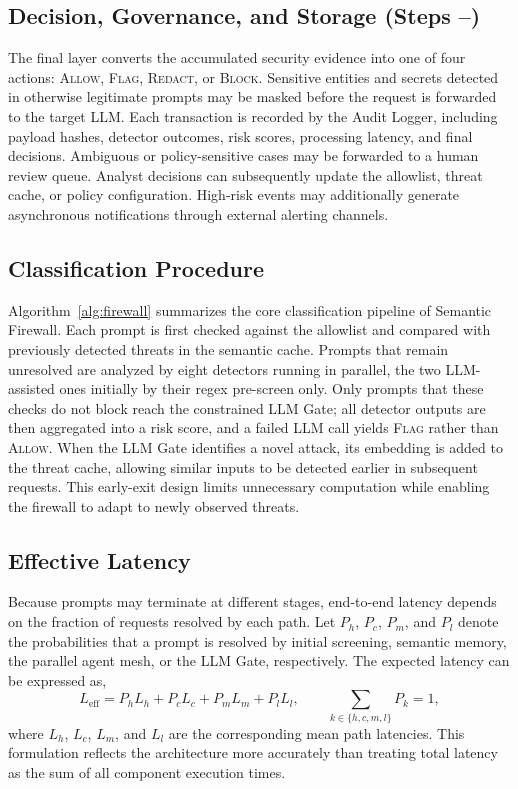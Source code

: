 \documentclass[runningheads]{llncs}
\newif\ifrev
\newcommand{\rev}[1]{\ifrev\hl{#1}\else#1\fi}                  %
\newcommand{\revm}[1]{\ifrev\colorbox{yellow}{$#1$}\else#1\fi} %
\begin{document}
\subsection{Decision, Governance, and Storage (Steps --)}
The final layer converts the accumulated security evidence into one of four actions: \textsc{Allow}, \textsc{Flag}, \textsc{Redact}, or \textsc{Block}. Sensitive entities and secrets detected in otherwise legitimate prompts may be masked before the request is forwarded to the target LLM. Each transaction is recorded by the Audit Logger, including payload hashes, detector outcomes, risk scores, processing latency, and final decisions. Ambiguous or policy-sensitive cases may be forwarded to a human review queue. Analyst decisions can subsequently update the allowlist, threat cache, or policy configuration. High-risk events may additionally generate asynchronous notifications through external alerting channels.
\subsection{Classification Procedure}

Algorithm~\ref{alg:firewall} summarizes the core classification pipeline of Semantic Firewall. Each prompt is first \rev{checked against the allowlist and} compared with previously detected threats in the semantic cache. Prompts that remain unresolved are analyzed by eight detectors running in parallel\rev{, the two LLM-assisted ones initially by their regex pre-screen only}. Only prompts \rev{that these checks do not block} reach the constrained LLM Gate\rev{; all detector outputs are then aggregated into a risk score, and a failed LLM call yields \textsc{Flag} rather than \textsc{Allow}}. When the LLM Gate identifies a novel attack, its embedding is added to the threat cache, allowing similar inputs to be detected earlier in subsequent requests. This early-exit design limits unnecessary computation while enabling the firewall to adapt to newly observed threats.

\subsection{Effective Latency}
Because prompts may terminate at different stages, end-to-end latency depends on the fraction of requests resolved by each path. Let $P_h$, $P_c$, $P_m$, and $P_l$ denote the probabilities that a prompt is resolved by initial screening, semantic memory, the parallel agent mesh, or the LLM Gate, respectively. The expected latency can be expressed as,
\begin{equation}
L_{\mathrm{eff}}
=
P_hL_h
+
P_cL_c
+
P_mL_m
+
P_lL_l,\qquad
\revm{\textstyle\sum_{k\in\{h,c,m,l\}}P_k=1},
\label{eq:effective_latency}
\end{equation}
where $L_h$, $L_c$, $L_m$, and $L_l$ are the corresponding mean path latencies. This formulation reflects the architecture more accurately than treating total latency as the sum of all component execution times.
\end{document}

